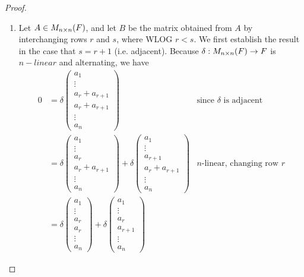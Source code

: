 \begin{proof} \ 

\begin{enumerate}
\item Let \(A \in M_{n \times n}(F)\), and let \(B\) be the matrix obtained from \(A\) by interchanging rows \(r\) and \(s\), where WLOG \(r < s\).
We first establish the result in the case that \(s = r + 1\) (i.e. adjacent).
Because \(\delta: M_{n \times n}(F) \to F\) is \(n-linear\) and alternating, we have
\begin{align*}
    0 & = \delta\left(\begin{array}{c} a_{1} \\ \vdots \\ a_{r}+a_{r+1} \\ a_{r}+a_{r+1} \\ \vdots \\ a_{n} \end{array}\right) & \text{since \(\delta\) is adjacent} \\
      & = \delta\left(\begin{array}{c} a_{1} \\ \vdots \\ a_{r} \\ a_{r} + a_{r+1} \\ \vdots \\ a_{n} \end{array}\right)
        + \delta\left(\begin{array}{c} a_{1} \\ \vdots \\ a_{r+1} \\ a_{r} + a_{r+1} \\ \vdots \\ a_{n} \end{array}\right) & \text{\(n\)-linear, changing row \(r\)} \\
      & = \delta\left(\begin{array}{c} a_{1} \\ \vdots \\ a_{r} \\ a_{r} \\ \vdots \\ a_{n} \end{array}\right)
        + \delta\left(\begin{array}{c} a_{1} \\ \vdots \\ a_{r} \\ a_{r+1} \\ \vdots \\ a_{n} \end{array}\right)

\end{align*}
\end{enumerate}
\end{proof}
